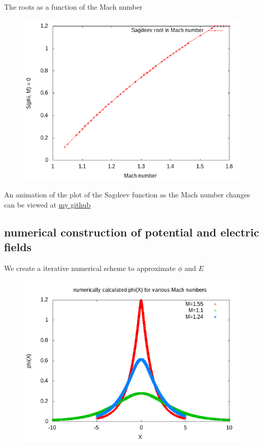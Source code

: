 \documentclass{report}
\begin{document}
The roots as a function of the Mach number
\begin{figure}
\includegraphics{sagdeevroots.png}
\end{figure}
An animation of the plot of the Sagdeev function as the Mach number changes can be viewed at 
\href{https://github.com/ramrunner/mhd-lisp/blob/master/doc/anim.gif}{my github}

\subsection{numerical construction of potential and electric fields}
We create a iterative numerical scheme to approximate $\phi$ and $E$
\begin{figure}
\includegraphics{phiofxvarm.png}
\end{figure}
\end{document}
